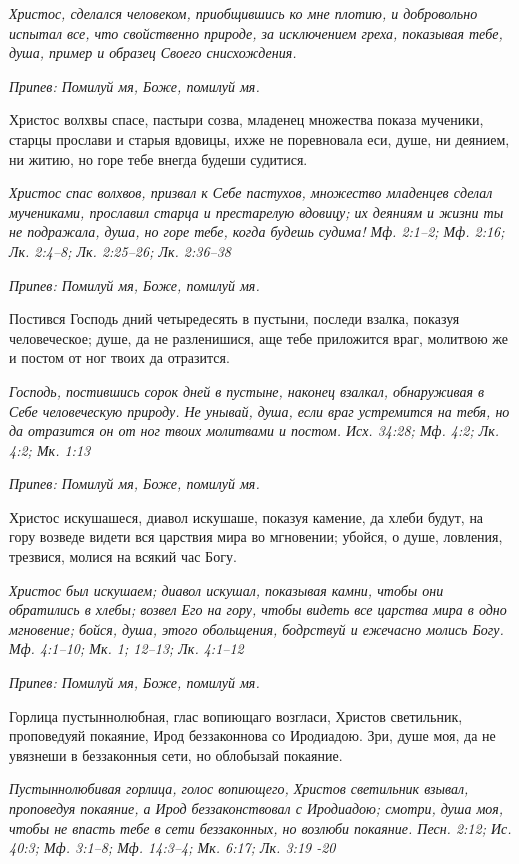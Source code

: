 \itshape Христос, сделался человеком, приобщившись ко мне плотию, и добровольно испытал все, что свойственно природе, за исключением греха, показывая тебе, душа, пример и образец Своего снисхождения.\normalfont{}


\itshape Припев:\normalfont{} Помилуй мя, Боже, помилуй мя.


Христос волхвы спасе, пастыри созва, младенец множества показа мученики, старцы прослави и старыя вдовицы, ихже не поревновала еси, душе, ни деянием, ни житию, но горе тебе внегда будеши судитися.


\itshape Христос спас волхвов, призвал к Себе пастухов, множество младенцев сделал мучениками, прославил старца и престарелую вдовицу; их деяниям и жизни ты не подражала, душа, но горе тебе, когда будешь судима! Мф. 2:1–2; Мф. 2:16; Лк. 2:4–8; Лк. 2:25–26; Лк. 2:36–38\normalfont{}


\itshape Припев:\normalfont{} Помилуй мя, Боже, помилуй мя.


Постився Господь дний четыредесять в пустыни, последи взалка, показуя человеческое; душе, да не разленишися, аще тебе приложится враг, молитвою же и постом от ног твоих да отразится.


\itshape Господь, постившись сорок дней в пустыне, наконец взалкал, обнаруживая в Себе человеческую природу. Не унывай, душа, если враг устремится на тебя, но да отразится он от ног твоих молитвами и постом. Исх. 34:28; Мф. 4:2; Лк. 4:2; Мк. 1:13\normalfont{}


\itshape Припев:\normalfont{} Помилуй мя, Боже, помилуй мя.


Христос искушашеся, диавол искушаше, показуя камение, да хлеби будут, на гору возведе видети вся царствия мира во мгновении; убойся, о душе, ловления, трезвися, молися на всякий час Богу.


\itshape Христос был искушаем; диавол искушал, показывая камни, чтобы они обратились в хлебы; возвел Его на гору, чтобы видеть все царства мира в одно мгновение; бойся, душа, этого обольщения, бодрствуй и ежечасно молись Богу. Мф. 4:1–10; Мк. 1; 12–13; Лк. 4:1–12\normalfont{}


\itshape Припев:\normalfont{} Помилуй мя, Боже, помилуй мя.


Горлица пустыннолюбная, глас вопиющаго возгласи, Христов светильник, проповедуяй покаяние, Ирод беззаконнова со Иродиадою. Зри, душе моя, да не увязнеши в беззаконныя сети, но облобызай покаяние.


\itshape Пустыннолюбивая горлица, голос вопиющего, Христов светильник взывал, проповедуя покаяние, а Ирод беззаконствовал с Иродиадою; смотри, душа моя, чтобы не впасть тебе в сети беззаконных, но возлюби покаяние. Песн. 2:12; Ис. 40:3; Мф. 3:1–8; Мф. 14:3–4; Мк. 6:17; Лк. 3:19 -20\normalfont{}


